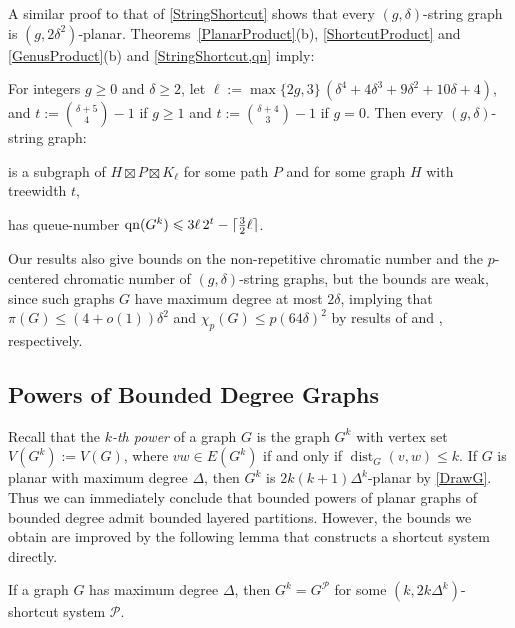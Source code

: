 \documentclass{patmorin}
\DeclareMathOperator{\dist}{dist}
\DeclareMathOperator{\qn}{qn}
\DeclarePairedDelimiter{\ceil}{\lceil}{\rceil}
\newcommand{\PP}{\mathcal{P}}
\renewcommand{\le}{\leqslant}
\renewcommand{\geq}{\geqslant}
\renewcommand{\leq}{\leqslant}
\begin{document}
A similar proof to that of \cref{StringShortcut} shows that every $(g,\delta)$-string graph is $(g,2\delta^2)$-planar. Theorems~\ref{PlanarProduct}(b), \ref{ShortcutProduct}  and \ref{GenusProduct}(b) and \cref{StringShortcut,qn} imply:

\begin{thm}
\label{StringPartition}
For integers $g\geq 0$ and $\delta\geq 2$, let $\ell:= \max\{2g,3\} \,(\delta^4 + 4 \delta^3 + 9 \delta^2 + 10 \delta + 4)$, 
and $t:= \binom{ \delta+5}{4}-1$ if $g\geq 1$ and $t:= \binom{ \delta+4}{3}-1$ if $g=0$. 
Then  every $(g,\delta)$-string graph: 
\begin{compactitem}
	\item is a subgraph of $H\boxtimes P \boxtimes K_{\ell}$ for some path $P$ and for some graph $H$ with treewidth $t$,
	\item has queue-number $\qn(G^k) \leq 3 \ell \, 2^t - \ceil{\tfrac{3}{2}\ell}$.
\end{compactitem}
\end{thm}

Our results also give bounds on the non-repetitive chromatic number and the $p$-centered chromatic number of $(g,\delta)$-string graphs, but the bounds are weak, since such graphs $G$ have maximum degree at most $2\delta$, implying that $\pi(G) \leq (4+o(1))\delta^2$ and $\chi_p(G)\le p(64\delta)^2$ by results of \citet{DJKW16} and \citet{debski.felsner.ea:improved}, respectively.

\subsection{Powers of Bounded Degree Graphs}
\label{Powers}

Recall that the \emph{$k$-th power} of a graph $G$ is the graph $G^k$ with vertex set $V(G^k):=V(G)$, where $vw\in E(G^k)$ if and only if $\dist_G(v,w)\leq k$. If $G$ is planar with maximum degree $\Delta$, then $G^k$ is $2k(k+1)\Delta^{k}$-planar by \cref{DrawG}. Thus we can immediately conclude that bounded powers of planar graphs of bounded degree admit bounded layered partitions. However, the bounds we obtain are improved by the following lemma that constructs a shortcut system directly.

\begin{lem}
\label{PowerShortcut}
If a graph $G$ has maximum degree $\Delta$, then $G^k = G^\PP$ for some $(k,2k \Delta^{k})$-shortcut system $\PP$.
\end{lem}
\end{document}
